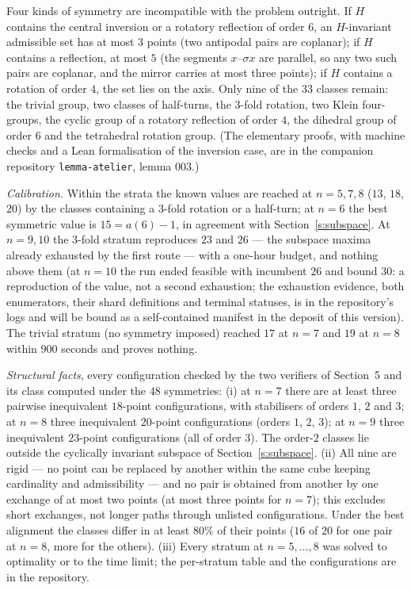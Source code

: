 \documentclass[11pt,a4paper]{article}
\begin{document}
Four kinds of symmetry are incompatible with the problem outright.  If $H$ contains the central
inversion or a rotatory reflection of order $6$, an $H$-invariant admissible set has at most $3$
points (two antipodal pairs are coplanar); if $H$ contains a reflection, at most $5$ (the segments
$x$--$\sigma x$ are parallel, so any two such pairs are coplanar, and the mirror carries at most
three points); if $H$ contains a rotation of order $4$, the set lies on the axis.  Only nine of the
$33$ classes remain: the trivial group, two classes of half-turns, the $3$-fold rotation, two
Klein four-groups, the cyclic group of a rotatory reflection of order $4$, the dihedral group
of order $6$ and the tetrahedral rotation group.  (The elementary proofs, with machine checks
and a Lean formalisation of the inversion case, are in the companion repository
\texttt{lemma-atelier}, lemma 003.)

\emph{Calibration.}  Within the strata the known values are reached at $n=5,7,8$ ($13$, $18$,
$20$) by the classes containing a $3$-fold rotation or a half-turn; at $n=6$ the best symmetric
value is $15=a(6)-1$, in agreement with Section~\ref{s:subspace}.  At $n=9,10$ the $3$-fold
stratum reproduces $23$ and $26$ --- the subspace maxima already exhausted by the first route ---
with a one-hour budget, and nothing above them (at $n=10$ the run ended feasible with incumbent $26$
and bound $30$: a reproduction of the value, not a second exhaustion; the exhaustion evidence, both
enumerators, their shard definitions and terminal statuses, is in the repository's logs and will be
bound as a self-contained manifest in the deposit of this version).  The trivial stratum (no symmetry imposed)
reached $17$ at $n=7$ and $19$ at $n=8$ within $900$ seconds and proves nothing.

\emph{Structural facts}, every configuration checked by the two verifiers of Section~5 and its
class computed under the $48$ symmetries: (i) at $n=7$ there are at least three pairwise
inequivalent $18$-point configurations, with stabilisers of orders $1$, $2$ and $3$; at $n=8$
three inequivalent $20$-point configurations (orders $1$, $2$, $3$); at $n=9$ three inequivalent
$23$-point configurations (all of order $3$).  The order-$2$ classes lie outside the cyclically
invariant subspace of Section~\ref{s:subspace}.  (ii) All nine are rigid --- no point can be
replaced by another within the same cube keeping cardinality and admissibility --- and no pair is
obtained from another by one exchange of at most two points (at most three points for $n=7$); this
excludes short exchanges, not longer paths through unlisted configurations.  Under the best alignment the classes differ in at least $80\%$ of
their points ($16$ of $20$ for one pair at $n=8$, more for the others).  (iii) Every stratum at $n=5,\dots,8$ was solved to optimality or to the time limit;
the per-stratum table and the configurations are in the repository.
\end{document}
